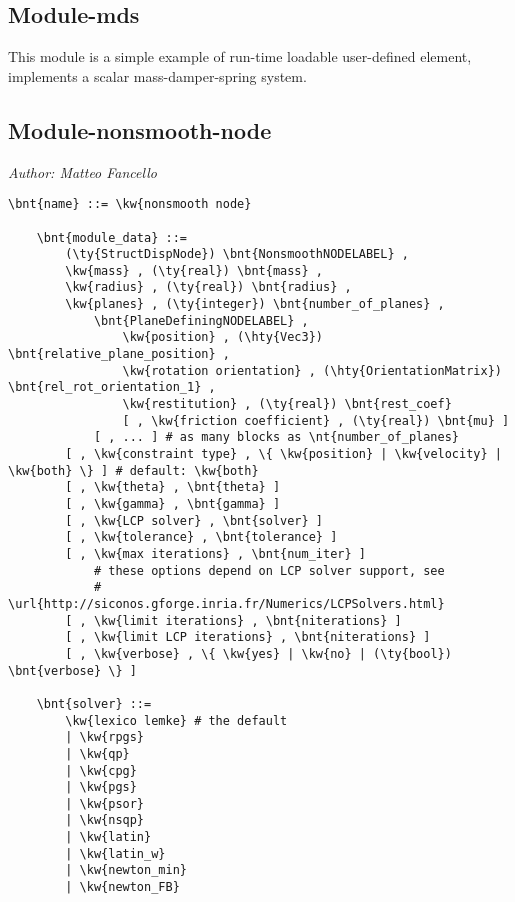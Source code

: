 \subsection{Module-mds}
This module is a simple example of run-time loadable user-defined element,
implements a scalar mass-damper-spring system.

\subsection{Module-nonsmooth-node}
\emph{Author: Matteo Fancello}
\begin{Verbatim}[commandchars=\\\{\}]
    \bnt{name} ::= \kw{nonsmooth node}

    \bnt{module_data} ::=
        (\ty{StructDispNode}) \bnt{NonsmoothNODELABEL} ,
        \kw{mass} , (\ty{real}) \bnt{mass} ,
        \kw{radius} , (\ty{real}) \bnt{radius} ,
        \kw{planes} , (\ty{integer}) \bnt{number_of_planes} ,
            \bnt{PlaneDefiningNODELABEL} ,
                \kw{position} , (\hty{Vec3}) \bnt{relative_plane_position} ,
                \kw{rotation orientation} , (\hty{OrientationMatrix}) \bnt{rel_rot_orientation_1} ,
                \kw{restitution} , (\ty{real}) \bnt{rest_coef}
                [ , \kw{friction coefficient} , (\ty{real}) \bnt{mu} ] 
            [ , ... ] # as many blocks as \nt{number_of_planes}
        [ , \kw{constraint type} , \{ \kw{position} | \kw{velocity} | \kw{both} \} ] # default: \kw{both}
        [ , \kw{theta} , \bnt{theta} ]
        [ , \kw{gamma} , \bnt{gamma} ]
        [ , \kw{LCP solver} , \bnt{solver} ]
        [ , \kw{tolerance} , \bnt{tolerance} ]
        [ , \kw{max iterations} , \bnt{num_iter} ]
            # these options depend on LCP solver support, see
            # \url{http://siconos.gforge.inria.fr/Numerics/LCPSolvers.html}
        [ , \kw{limit iterations} , \bnt{niterations} ]
        [ , \kw{limit LCP iterations} , \bnt{niterations} ]
        [ , \kw{verbose} , \{ \kw{yes} | \kw{no} | (\ty{bool}) \bnt{verbose} \} ]

    \bnt{solver} ::=
        \kw{lexico lemke} # the default
        | \kw{rpgs}
        | \kw{qp}
        | \kw{cpg}
        | \kw{pgs}
        | \kw{psor}
        | \kw{nsqp}
        | \kw{latin}
        | \kw{latin_w}
        | \kw{newton_min}
        | \kw{newton_FB}
\end{Verbatim}

